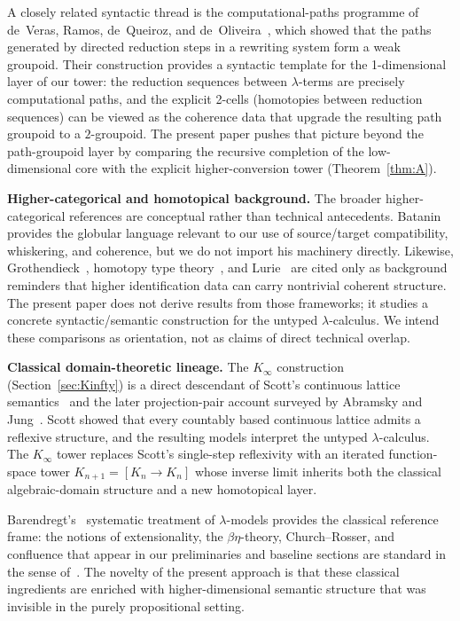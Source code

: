 \documentclass[webpdf,traditional,large,numbered]{oup-authoring-template}
\theoremstyle{thmstyleone}%
\theoremstyle{thmstyletwo}%
\theoremstyle{thmstylethree}%
\newcommand{\Kinf}{K_\infty}
\begin{document}
A closely related syntactic thread is the computational-paths programme of
de~Veras, Ramos, de~Queiroz, and de~Oliveira~\cite{deVeras:computational},
which showed that the paths generated by directed reduction steps in a rewriting
system form a weak groupoid.  Their construction provides a syntactic template
for the 1-dimensional layer of our tower: the reduction sequences between
$\lambda$-terms are precisely computational paths, and the explicit 2-cells
(homotopies between reduction sequences) can be viewed as the coherence data
that upgrade the resulting path groupoid to a $2$-groupoid.  The present paper
pushes that picture beyond the path-groupoid layer by comparing the recursive
completion of the low-dimensional core with the explicit higher-conversion tower
(Theorem~\ref{thm:A}).

\medskip
\noindent\textbf{Higher-categorical and homotopical background.}\quad
The broader higher-categorical references are conceptual rather than technical
antecedents.  Batanin~\cite{Batanin:monoidal} provides the globular language
relevant to our use of source/target compatibility, whiskering, and coherence,
but we do not import his machinery directly.  Likewise,
Grothendieck~\cite{Grothendieck:pursuing}, homotopy type theory~\cite{HoTT},
and Lurie~\cite{Lurie:htt} are cited only as background reminders that higher
identification data can carry nontrivial coherent structure.  The present paper
does not derive results from those frameworks; it studies a concrete
syntactic/semantic construction for the untyped $\lambda$-calculus.  We intend
these comparisons as orientation, not as claims of direct technical overlap.

\medskip
\noindent\textbf{Classical domain-theoretic lineage.}\quad
The $\Kinf$ construction (Section~\ref{sec:Kinfty}) is a direct descendant of
Scott's continuous lattice semantics~\cite{Scott:continuous} and the later
projection-pair account surveyed by Abramsky and
Jung~\cite{AbramskyJung:domain}.  Scott showed that every countably based
continuous lattice admits a reflexive structure, and the resulting models
interpret the untyped $\lambda$-calculus.  The $\Kinf$ tower replaces Scott's
single-step reflexivity with an iterated function-space tower
$K_{n+1}=[K_n\to K_n]$ whose inverse limit inherits both the classical
algebraic-domain structure and a new homotopical layer.

Barendregt's~\cite{Barendregt:lambda} systematic treatment of $\lambda$-models
provides the classical reference frame: the notions of extensionality, the
$\beta\eta$-theory, Church--Rosser, and confluence that appear in our
preliminaries and baseline sections are standard in the sense
of~\cite{Barendregt:lambda}.  The novelty of the present approach is that these
classical ingredients are enriched with higher-dimensional semantic structure
that was invisible in the purely propositional setting.
\end{document}
